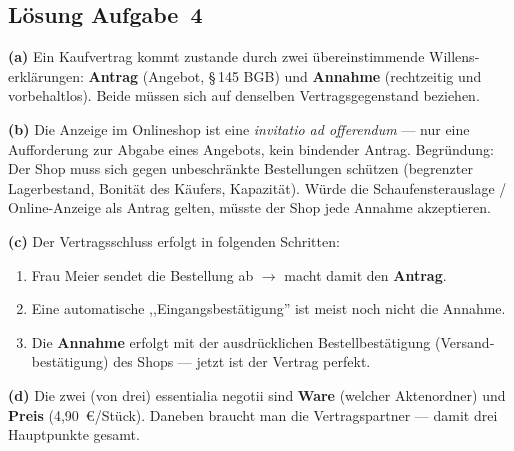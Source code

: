 \documentclass[11pt, a4paper]{article}
\begin{document}
\subsection*{Lösung Aufgabe~4}
\begin{loesung}
\textbf{(a)} Ein Kaufvertrag kommt zustande durch zwei übereinstimmende Willens­
erklärungen: \textbf{Antrag} (Angebot, §\,145 BGB) und \textbf{Annahme} (rechtzeitig
und vorbehaltlos). Beide müssen sich auf denselben Vertragsgegenstand beziehen.

\textbf{(b)} Die Anzeige im Onlineshop ist eine \emph{invitatio ad offerendum} ---
nur eine Aufforderung zur Abgabe eines Angebots, kein bindender Antrag. Begründung:
Der Shop muss sich gegen unbeschränkte Bestellungen schützen (begrenzter Lagerbestand,
Bonität des Käufers, Kapazität). Würde die Schaufensterauslage / Online-Anzeige als
Antrag gelten, müsste der Shop jede Annahme akzeptieren.

\textbf{(c)} Der Vertragsschluss erfolgt in folgenden Schritten:
\begin{enumerate}[itemsep=0pt]
  \item Frau Meier sendet die Bestellung ab $\to$ macht damit den \textbf{Antrag}.
  \item Eine automatische ,,Eingangsbestätigung'' ist meist noch nicht die Annahme.
  \item Die \textbf{Annahme} erfolgt mit der ausdrücklichen Bestellbestätigung
    (Versand­bestätigung) des Shops --- jetzt ist der Vertrag perfekt.
\end{enumerate}

\textbf{(d)} Die zwei (von drei) essentialia negotii sind \textbf{Ware} (welcher
Aktenordner) und \textbf{Preis} (4{,}90~€/Stück). Daneben braucht man die Vertragspartner
--- damit drei Hauptpunkte gesamt.
\end{loesung}
\end{document}
